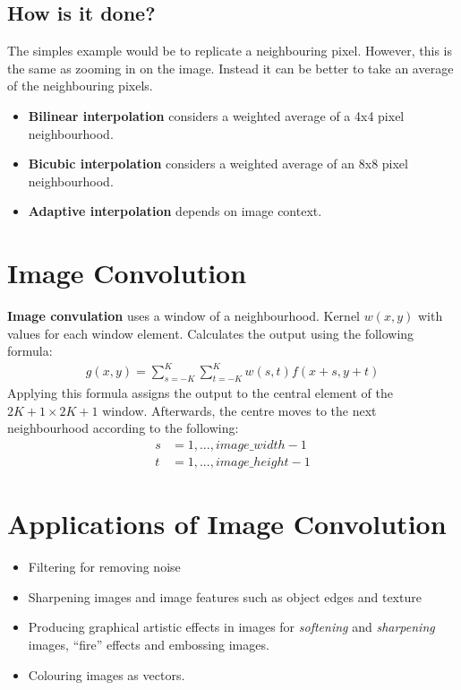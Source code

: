 \documentclass{article}
\begin{document}
\subsection{How is it done?}
The simples example would be to replicate a neighbouring pixel.
However, this is the same as zooming in on the image.
Instead it can be better to take an average of the neighbouring pixels.
\begin{itemize}
	\item \textbf{Bilinear interpolation} considers a weighted average of a 4x4 pixel neighbourhood.
	\item \textbf{Bicubic interpolation} considers a weighted average of an 8x8 pixel neighbourhood. 
	\item \textbf{Adaptive interpolation} depends on image context.
\end{itemize}

\section{Image Convolution}
\textbf{Image convulation} uses a window of a neighbourhood.
Kernel $w(x,y)$ with values for each window element.
Calculates the output using the following formula:
\begin{align*}
	g(x,y) = \sum^K_{s=-K}\sum^K_{t=-K}w(s,t)f(x+s,y+t)
\end{align*}
Applying this formula assigns the output to the central element of the $2K+1 \times 2K+1$ window.
Afterwards, the centre moves to the next neighbourhood according to the following:
\begin{align*}
	s &= 1,..., image\_width-1 \\
	t &= 1,..., image\_height-1
\end{align*}

\section{Applications of Image Convolution}
\begin{itemize}
	\item Filtering for removing noise
	\item Sharpening images and image features such as object edges and texture
	\item Producing graphical artistic effects in images for \textit{softening} and \textit{sharpening} images, ``fire'' effects and embossing images.
	\item Colouring images as vectors.
\end{itemize}
\end{document}
